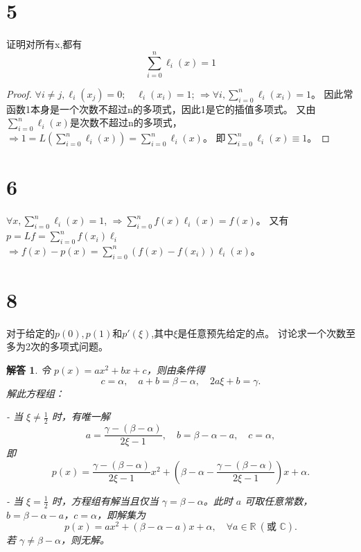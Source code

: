 \documentclass{article}
\newtheorem{solution}{解答}
\begin{document}
\section*{5}
证明对所有x,都有$$\sum_{i=0}^{n} \ell_i(x)=1$$
\begin{proof}
$\forall i\neq j, \ell_i(x_j)=0;\quad \ell_i(x_i)=1$;
$\Rightarrow \forall i, \sum_{i=0}^{n} \ell_i(x_i)=1$。
因此常函数1本身是一个次数不超过n的多项式，因此1是它的插值多项式。
又由$\sum_{i=0}^{n} \ell_i(x)$是次数不超过n的多项式，
$\Rightarrow 1=L(\sum_{i=0}^{n} \ell_i(x))=\sum_{i=0}^{n} \ell_i(x)$。
即$\sum_{i=0}^{n} \ell_i(x)\equiv 1$。
\end{proof}
\section*{6}
$\forall x ,\sum_{i=0}^{n} \ell_i(x)=1$,
$\Rightarrow \sum_{i=0}^{n} f(x)\ell_i(x) = f(x)$。
又有$p=Lf = \sum_{i=0}^{n} f(x_i) \ell_i$
$\Rightarrow f(x)-p(x)=\sum_{i=0}^{n} (f(x)-f(x_i))\ell_i(x)$。
\section*{8}
对于给定的$p(0),p(1)$和$p'(\xi )$,其中$\xi$是任意预先给定的点。
讨论求一个次数至多为2次的多项式问题。

\begin{solution}
令 \(p(x)=ax^2+bx+c\)，则由条件得
\[
c=\alpha,\quad a+b=\beta-\alpha,\quad 2a\xi+b=\gamma.
\]
解此方程组：

- 当 \(\xi\neq\frac{1}{2}\) 时，有唯一解
  \[
  a=\frac{\gamma-(\beta-\alpha)}{2\xi-1},\quad b=\beta-\alpha-a,\quad c=\alpha,
  \]
  即
  \[
  p(x)=\frac{\gamma-(\beta-\alpha)}{2\xi-1}x^2+\left(\beta-\alpha-\frac{\gamma-(\beta-\alpha)}{2\xi-1}\right)x+\alpha.
  \]

- 当 \(\xi=\frac{1}{2}\) 时，方程组有解当且仅当 \(\gamma=\beta-\alpha\)。此时 \(a\) 可取任意常数，\(b=\beta-\alpha-a\)，\(c=\alpha\)，即解集为
  \[
  p(x)=ax^2+(\beta-\alpha-a)x+\alpha,\quad \forall a\in\mathbb{R}\ (\text{或 }\mathbb{C}).
  \]
  若 \(\gamma\neq\beta-\alpha\)，则无解。
\end{solution}
\end{document}

